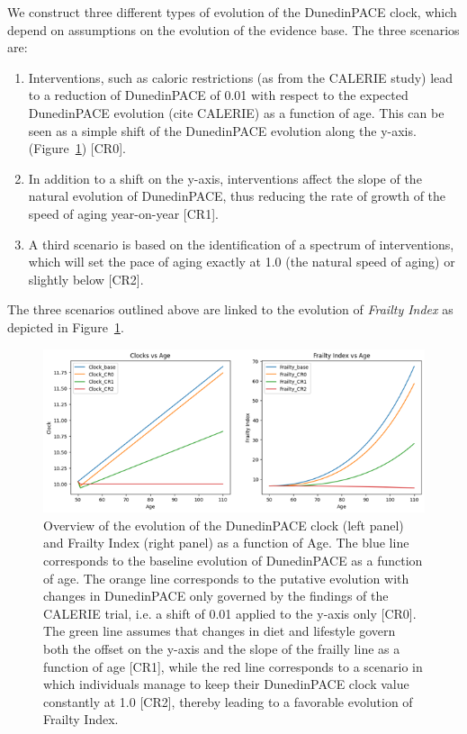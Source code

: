 We construct three different types of evolution of the DunedinPACE clock, which depend on assumptions on the evolution of the evidence base. The three scenarios are:

\begin{enumerate}
    \item Interventions, such as caloric restrictions (as from the CALERIE study) lead to a reduction of DunedinPACE of 0.01 with respect to the expected DunedinPACE evolution (cite CALERIE) as a function of age. This can be seen as a simple shift of the DunedinPACE evolution along the y-axis. (Figure~\ref{fig:clocks_frailty}) [CR0]. 
    
    \item In addition to a shift on the y-axis, interventions affect the slope of the natural evolution of DunedinPACE, thus reducing the rate of growth of the speed of aging year-on-year [CR1].
    
    \item A third scenario is based on the identification of a spectrum of interventions, which will set the pace of aging exactly at 1.0 (the natural speed of aging) or slightly below [CR2]. 
\end{enumerate}

The three scenarios outlined above are linked to the evolution of \textit{Frailty Index} as depicted in Figure~\ref{fig:clocks_frailty}.

\begin{figure}[h]
\centering
\includegraphics[width=\textwidth]{figures/Figure3.png}
\caption{Overview of the evolution of the DunedinPACE clock (left panel) and Frailty Index (right panel) as a function of Age. The blue line corresponds to the baseline evolution of DunedinPACE as a function of age. The orange line corresponds to the putative evolution with changes in DunedinPACE only governed by the findings of the CALERIE trial, i.e. a shift of 0.01 applied to the y-axis only [CR0]. The green line assumes that changes in diet and lifestyle govern both the offset on the y-axis and the slope of the frailly line as a function of age [CR1], while the red line corresponds to a scenario in which individuals manage to keep their DunedinPACE clock value constantly at 1.0 [CR2], thereby leading to a favorable evolution of Frailty Index.}
\label{fig:clocks_frailty}
\end{figure}

